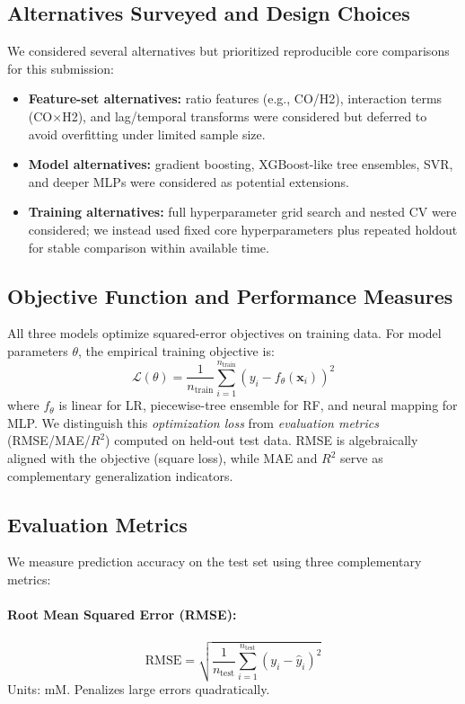 \documentclass[conference]{IEEEtran}
\begin{document}
\subsection{Alternatives Surveyed and Design Choices}
We considered several alternatives but prioritized reproducible core comparisons for this submission:
\begin{itemize}
\item \textbf{Feature-set alternatives:} ratio features (e.g., CO/H2), interaction terms (CO$\times$H2), and lag/temporal transforms were considered but deferred to avoid overfitting under limited sample size.
\item \textbf{Model alternatives:} gradient boosting, XGBoost-like tree ensembles, SVR, and deeper MLPs were considered as potential extensions.
\item \textbf{Training alternatives:} full hyperparameter grid search and nested CV were considered; we instead used fixed core hyperparameters plus repeated holdout for stable comparison within available time.
\end{itemize}

\subsection{Objective Function and Performance Measures}
All three models optimize squared-error objectives on training data. For model parameters $\theta$, the empirical training objective is:
\[
\mathcal{L}(\theta)=\frac{1}{n_{\text{train}}}\sum_{i=1}^{n_{\text{train}}}\left(y_i-f_\theta(\mathbf{x}_i)\right)^2
\]
where $f_\theta$ is linear for LR, piecewise-tree ensemble for RF, and neural mapping for MLP. We distinguish this \textit{optimization loss} from \textit{evaluation metrics} (RMSE/MAE/$R^2$) computed on held-out test data. RMSE is algebraically aligned with the objective (square loss), while MAE and $R^2$ serve as complementary generalization indicators.

\subsection{Evaluation Metrics}
We measure prediction accuracy on the test set using three complementary metrics:

\paragraph{Root Mean Squared Error (RMSE):}
\[
\text{RMSE} = \sqrt{\frac{1}{n_{\text{test}}}\sum_{i=1}^{n_{\text{test}}}(y_i - \hat{y}_i)^2}
\]
Units: mM. Penalizes large errors quadratically.
\end{document}

